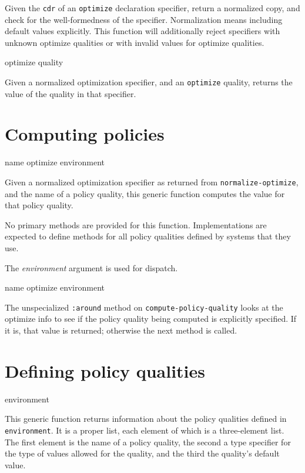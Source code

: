Given the \texttt{cdr} of an \texttt{optimize} declaration specifier,
return a normalized copy, and check for the well-formedness of the
specifier. Normalization means including default values explicitly.
This function will additionally reject specifiers with unknown
optimize qualities or with invalid values for optimize qualities.

 {optimize quality}

Given a normalized optimization specifier, and an \texttt{optimize}
quality, returns the value of the quality in that specifier.

\section{Computing policies}

 {name optimize environment}

Given a normalized optimization specifier as returned from
\texttt{normalize-optimize}, and the name of a policy quality, this
generic function computes the value for that policy quality.

No primary methods are provided for this function. Implementations
are expected to define methods for all policy qualities defined by
\sysname{} systems that they use.

The \textit{environment} argument is used for dispatch.

 {name optimize environment}

The unspecialized \texttt{:around} method on \texttt{compute-policy-quality}
looks at the optimize info to see if the policy quality being computed
is explicitly specified. If it is, that value is returned; otherwise
the next method is called.

\section{Defining policy qualities}

 {environment}

This generic function returns information about the policy qualities
defined in \texttt{environment}.  It is a
proper list, each element of which is a three-element list. The first
element is the name of a policy quality, the second a type specifier
for the type of values allowed for the quality, and the third the
quality's default value.

